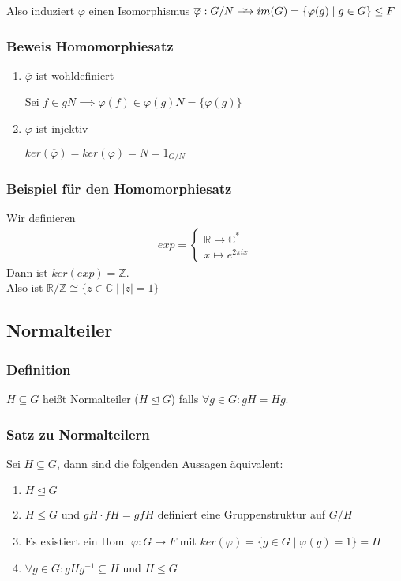 \documentclass[12pt, german]{article}
\newcommand\iso{\xrightarrow{
		\,\smash{\raisebox{-0.65ex}{\ensuremath{\scriptstyle\sim}}}\,}}
\begin{document}
	Also induziert $\varphi$ einen Isomorphismus $\overline{\varphi}: G/N \iso im(G) = \{\varphi(g) \mid g \in G\} \leq F$
	
	\subsubsection{Beweis Homomorphiesatz}
	\begin{enumerate}[label=\arabic*)]
		\item $\overline{\varphi}$ ist wohldefiniert ~\par
		Sei $f\in gN \implies \varphi(f) \in \varphi(g)N = \{\varphi(g)\}$
		
		\item $\overline{\varphi}$ ist injektiv ~\par
		$ker(\overline{\varphi}) = ker(\varphi) = N = 1_{G/N}$
	\end{enumerate}
	
	\subsubsection{Beispiel für den Homomorphiesatz}
	Wir definieren 
	\begin{align*}
		exp = \begin{cases}
			\mathbb{R} \to \mathbb{C}^\ast\\
			x \mapsto e^{2\pi i x}
		\end{cases}
	\end{align*}
	Dann ist $ker(exp) = \mathbb Z $.\\ 
	Also ist $\mathbb R / \mathbb Z \cong \{z \in \mathbb C \mid |z| = 1\}$	
	
	
	
	\subsection{Normalteiler}		
	\subsubsection{Definition}
	$H \subseteq G$ heißt Normalteiler ($H\trianglelefteq G$) falls $\forall g \in G : gH = Hg$. 
	
	\subsubsection{Satz zu Normalteilern}
	Sei $H \subseteq G$, dann sind die folgenden Aussagen äquivalent: 
	\begin{enumerate}[label=\arabic*)]
		\item $H\trianglelefteq G$
		\item $H \leq G$ und $gH \cdot fH = gfH$ definiert eine Gruppenstruktur auf $G/H$
		\item Es existiert ein Hom. $\varphi: G \to F$ mit $ker(\varphi) = \{g \in G \mid \varphi(g)= 1\} = H$
		\item $\forall g \in G : gHg^{-1} \subseteq H$ und $H \leq G$
	\end{enumerate}
	
\end{document}
